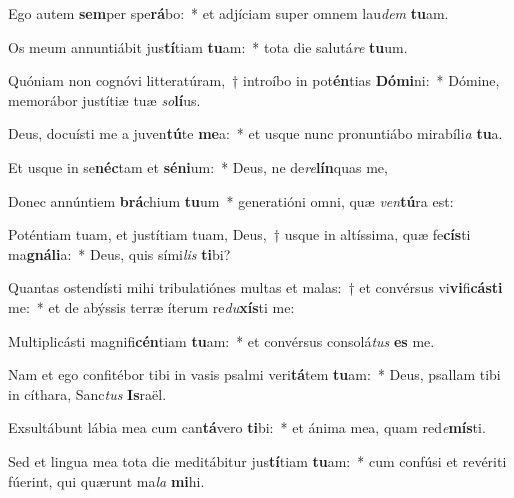 \item Ego autem \textbf{sem}per spe\textbf{rá}bo:~* et adjíciam super omnem lau\textit{dem} \textbf{tu}am.
\item Os meum annuntiábit jus\textbf{tí}tiam \textbf{tu}am:~* tota die salutá\textit{re} \textbf{tu}um.
\item Quóniam non cognóvi litteratúram,~† introíbo in pot\textbf{én}tias \textbf{Dó}\textbf{mi}ni:~* Dómine, memorábor justítiæ tuæ \textit{so}\textbf{lí}us.
\item Deus, docuísti me a juven\textbf{tú}te \textbf{me}a:~* et usque nunc pronuntiábo mirabíli\textit{a} \textbf{tu}a.
\item Et usque in se\textbf{néc}tam et \textbf{sé}\textbf{ni}um:~* Deus, ne de\textit{re}\textbf{lín}quas me,
\item Donec annúntiem \textbf{brá}chium \textbf{tu}um~* generatióni omni, quæ \textit{ven}\textbf{tú}ra est:
\item Poténtiam tuam, et justítiam tuam, Deus,~† usque in altíssima, quæ fe\textbf{cís}ti ma\textbf{gná}\textbf{li}a:~* Deus, quis sími\textit{lis} \textbf{ti}bi?
\item Quantas ostendísti mihi tribulatiónes multas et malas:~† et convérsus vi\textbf{vi}fi\textbf{cás}\textbf{ti} me:~* et de abýssis terræ íterum re\textit{du}\textbf{xís}ti me:
\item Multiplicásti magnifi\textbf{cén}tiam \textbf{tu}am:~* et convérsus consolá\textit{tus} \textbf{es} me.
\item Nam et ego confitébor tibi in vasis psalmi veri\textbf{tá}tem \textbf{tu}am:~* Deus, psallam tibi in cíthara, Sanc\textit{tus} \textbf{Is}raël.
\item Exsultábunt lábia mea cum can\textbf{tá}vero \textbf{ti}bi:~* et ánima mea, quam red\textit{e}\textbf{mís}ti.
\item Sed et lingua mea tota die meditábitur jus\textbf{tí}tiam \textbf{tu}am:~* cum confúsi et revériti fúerint, qui quærunt ma\textit{la} \textbf{mi}hi.
